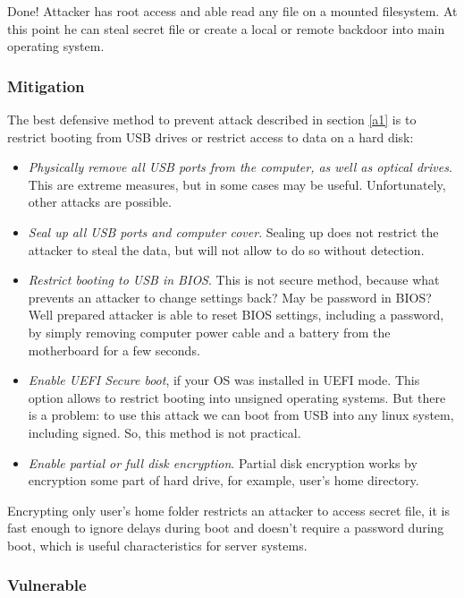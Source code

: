 Done! Attacker has root access and able read any file on a mounted filesystem. At this point he can steal secret file or create a local or remote backdoor into main operating system. 


\subsubsection*{Mitigation}
The best defensive method to prevent attack described in section \ref{a1} is to restrict booting from USB drives or restrict access to data on a hard disk:
\begin{itemize}
    \item \textit{Physically remove all USB ports from the computer, as well as optical drives}. This are extreme measures, but in some cases may be useful. Unfortunately, other attacks are possible.
    
    \item \textit{Seal up all USB ports and computer cover}. Sealing up does not restrict the attacker to steal the data, but will not allow to do so without detection. 
    
    \item \textit{Restrict booting to USB in BIOS}. This is not secure method, because what prevents an attacker to change settings back? May be password in BIOS? Well prepared attacker is able to reset BIOS settings, including a password, by simply removing computer power cable and a battery from the motherboard for a few seconds.
    
    \item \textit{Enable UEFI Secure boot}, if your OS was installed in UEFI mode. This option allows to restrict booting into unsigned operating systems. But there is a problem: to use this attack we can boot from USB into any linux system, including signed. So, this method is not practical.
    
    \item \textit{Enable partial or full disk encryption}. Partial disk encryption works by encryption some part of hard drive, for example, user's home directory. 
\end{itemize}

Encrypting only user's home folder restricts an attacker to access secret file, it is fast enough to ignore delays during boot and doesn't require a password during boot, which is useful characteristics for server systems. 


\subsubsection*{Vulnerable}




